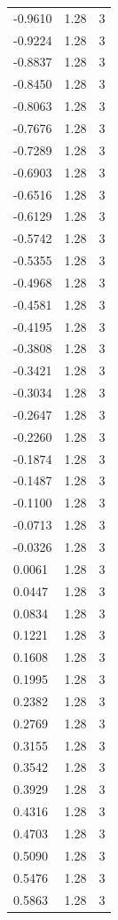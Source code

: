 \begin{longtable}{lrr}
  -0.9610 & 1.28 & 3 \\
  -0.9224 & 1.28 & 3 \\
  -0.8837 & 1.28 & 3 \\
  -0.8450 & 1.28 & 3 \\
  -0.8063 & 1.28 & 3 \\
  -0.7676 & 1.28 & 3 \\
  -0.7289 & 1.28 & 3 \\
  -0.6903 & 1.28 & 3 \\
  -0.6516 & 1.28 & 3 \\
  -0.6129 & 1.28 & 3 \\
  -0.5742 & 1.28 & 3 \\
  -0.5355 & 1.28 & 3 \\
  -0.4968 & 1.28 & 3 \\
  -0.4581 & 1.28 & 3 \\
  -0.4195 & 1.28 & 3 \\
  -0.3808 & 1.28 & 3 \\
  -0.3421 & 1.28 & 3 \\
  -0.3034 & 1.28 & 3 \\
  -0.2647 & 1.28 & 3 \\
  -0.2260 & 1.28 & 3 \\
  -0.1874 & 1.28 & 3 \\
  -0.1487 & 1.28 & 3 \\
  -0.1100 & 1.28 & 3 \\
  -0.0713 & 1.28 & 3 \\
  -0.0326 & 1.28 & 3 \\
  0.0061 & 1.28 & 3 \\
  0.0447 & 1.28 & 3 \\
  0.0834 & 1.28 & 3 \\
  0.1221 & 1.28 & 3 \\
  0.1608 & 1.28 & 3 \\
  0.1995 & 1.28 & 3 \\
  0.2382 & 1.28 & 3 \\
  0.2769 & 1.28 & 3 \\
  0.3155 & 1.28 & 3 \\
  0.3542 & 1.28 & 3 \\
  0.3929 & 1.28 & 3 \\
  0.4316 & 1.28 & 3 \\
  0.4703 & 1.28 & 3 \\
  0.5090 & 1.28 & 3 \\
  0.5476 & 1.28 & 3 \\
  0.5863 & 1.28 & 3 \\

\end{longtable}
